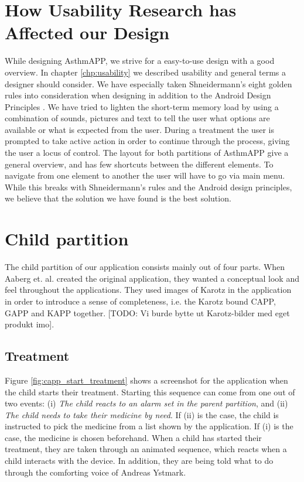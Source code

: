 \section{How Usability Research has Affected our Design}
\label{sec:usability-affect-design}
While designing AsthmAPP, we strive for a easy-to-use design with a good overview. In chapter \ref{chp:usability} we described usability and general terms a designer should consider. We have especially taken Shneidermann's eight golden rules into consideration when designing\cite{shneiderman2003designing} in addition to the Android Design Principles \cite{androiddesign}. 
We have tried to lighten the short-term memory load by using a combination of sounds, pictures and text to tell the user what options are available or what is expected from the user. During a treatment the user is prompted to take active action in order to continue through the process, giving the user a locus of control. 
The layout for both partitions of AsthmAPP give a general overview, and has few shortcuts between the different elements. To navigate from one element to another the user will have to go via main menu. While this breaks with Shneidermann's rules and the Android design principles, we believe that the solution we have found is the best solution.


\section{Child partition}
\label{sec:description-child-partition}
The child partition of our application consists mainly out of four parts. When Aaberg et. al. created the original application, they wanted a conceptual look and feel throughout the applications. They used images of Karotz in the application in order to introduce a sense of completeness, i.e. the Karotz bound CAPP, GAPP and KAPP together. [TODO: Vi burde bytte ut Karotz-bilder med eget produkt imo]. 

\subsection{Treatment}
\label{sec:sec:description-treatment}
Figure \ref{fig:capp_start_treatment} shows a screenshot for the application when the child starts their treatment. Starting this sequence can come from one out of two events: (i) \emph{The child reacts to an alarm set in the parent partition}, and (ii) \emph{The child needs to take their medicine by need}. If (ii) is the case, the child is instructed to pick the medicine from a list shown by the application. If (i) is the case, the medicine is chosen beforehand. When a child has started their treatment, they are taken through an animated sequence, which reacts when a child interacts with the device. In addition, they are being told what to do through the comforting voice of Andreas Ystmark.  


